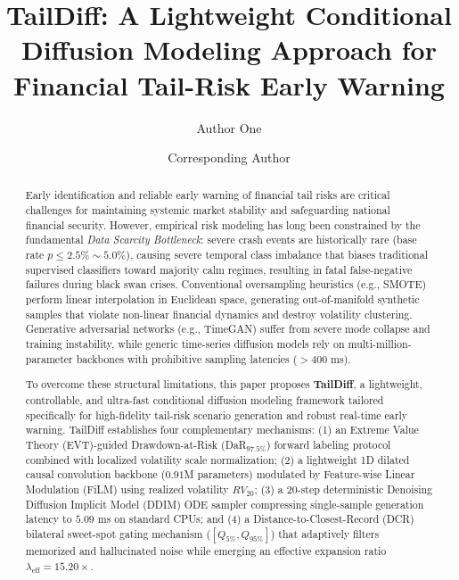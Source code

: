\documentclass[preprint,12pt,authoryear]{elsarticle}
\begin{document}
\begin{frontmatter}

\title{TailDiff: A Lightweight Conditional Diffusion Modeling Approach for Financial Tail-Risk Early Warning}

\author[inst1]{Author One}
\author[inst1]{Corresponding Author}


\begin{abstract}
Early identification and reliable early warning of financial tail risks are critical challenges for maintaining systemic market stability and safeguarding national financial security. However, empirical risk modeling has long been constrained by the fundamental \textit{Data Scarcity Bottleneck}: severe crash events are historically rare (base rate $p \le 2.5\% \sim 5.0\%$), causing severe temporal class imbalance that biases traditional supervised classifiers toward majority calm regimes, resulting in fatal false-negative failures during black swan crises. Conventional oversampling heuristics (e.g., SMOTE) perform linear interpolation in Euclidean space, generating out-of-manifold synthetic samples that violate non-linear financial dynamics and destroy volatility clustering. Generative adversarial networks (e.g., TimeGAN) suffer from severe mode collapse and training instability, while generic time-series diffusion models rely on multi-million-parameter backbones with prohibitive sampling latencies ($>400$ ms).

To overcome these structural limitations, this paper proposes \textbf{TailDiff}, a lightweight, controllable, and ultra-fast conditional diffusion modeling framework tailored specifically for high-fidelity tail-risk scenario generation and robust real-time early warning. TailDiff establishes four complementary mechanisms: (1) an Extreme Value Theory (EVT)-guided Drawdown-at-Risk (DaR$_{97.5\%}$) forward labeling protocol combined with localized volatility scale normalization; (2) a lightweight 1D dilated causal convolution backbone ($0.91$M parameters) modulated by Feature-wise Linear Modulation (FiLM) using realized volatility $RV_{20}$; (3) a 20-step deterministic Denoising Diffusion Implicit Model (DDIM) ODE sampler compressing single-sample generation latency to $5.09$ ms on standard CPUs; and (4) a Distance-to-Closest-Record (DCR) bilateral sweet-spot gating mechanism ($[Q_{5\%}, Q_{95\%}]$) that adaptively filters memorized and hallucinated noise while emerging an effective expansion ratio $\lambda_{\text{eff}} = 15.20\times$.


\end{abstract}
\end{frontmatter}
\end{document}
